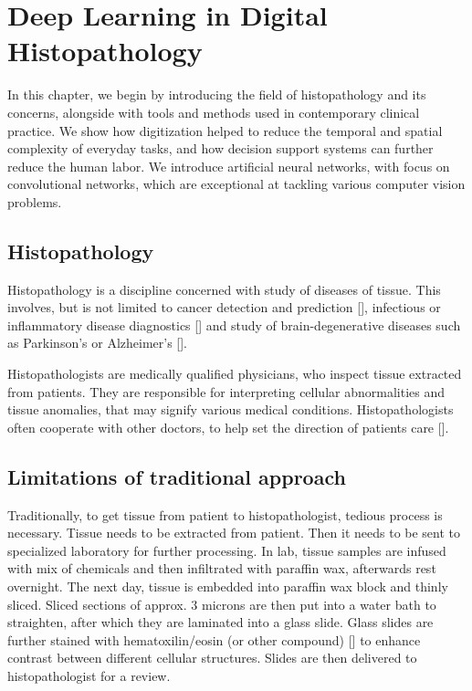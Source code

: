 \chapter{Deep Learning in Digital Histopathology}

In this chapter, we begin by introducing the field of histopathology and its concerns, alongside with tools and methods used in contemporary clinical practice. We show how digitization helped to reduce the temporal and spatial complexity of everyday tasks, and how decision support systems can further reduce the human labor. We introduce artificial neural networks, with focus on convolutional networks, which are exceptional at tackling various computer vision problems.

\section{Histopathology}

Histopathology is a discipline concerned with study of diseases of tissue. This involves, but is not limited to cancer detection and prediction [], infectious or inflammatory disease diagnostics [] and study of brain-degenerative diseases such as Parkinson's or Alzheimer's [].

Histopathologists are medically qualified physicians, who inspect tissue extracted from patients. They are responsible for interpreting cellular abnormalities and tissue anomalies, that may signify various medical conditions. Histopathologists often cooperate with other doctors, to help set the direction of patients care [].

\section{Limitations of traditional approach}

Traditionally, to get tissue from patient to histopathologist, tedious process is necessary. Tissue needs to be extracted from patient. Then it needs to be sent to specialized laboratory for further processing. In lab, tissue samples are infused with mix of chemicals and then infiltrated with paraffin wax, afterwards rest overnight. The next day, tissue is embedded into paraffin wax block and thinly sliced. Sliced sections of approx. $3$ microns are then put into a water bath to straighten, after which they are laminated into a glass slide. Glass slides are further stained with hematoxilin/eosin (or other compound) [] to enhance contrast between different cellular structures. Slides are then delivered to histopathologist for a review.

